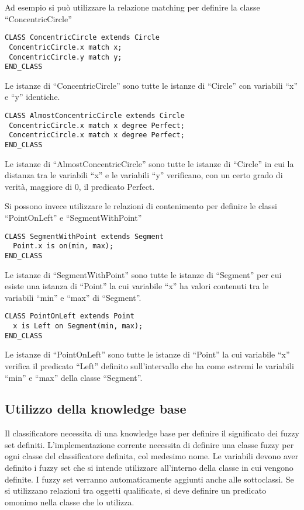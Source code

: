 Ad esempio si può utilizzare la relazione matching per definire la classe ``ConcentricCircle''
\begin{lstlisting}[language=fuzzyClassifier]
CLASS ConcentricCircle extends Circle 
 ConcentricCircle.x match x;
 ConcentricCircle.y match y; 
END_CLASS
\end{lstlisting}

Le istanze di ``ConcentricCircle'' sono tutte le istanze di ``Circle'' con variabili ``x'' e ``y'' identiche. 

\begin{lstlisting}[language=fuzzyClassifier]
CLASS AlmostConcentricCircle extends Circle 
 ConcentricCircle.x match x degree Perfect;
 ConcentricCircle.x match x degree Perfect; 
END_CLASS
\end{lstlisting}

Le istanze di ``AlmostConcentricCircle'' sono tutte le istanze di ``Circle'' in cui la distanza  tra le variabili ``x'' e le variabili ``y'' verificano, con un certo grado di verità, maggiore di 0,  il predicato Perfect.

Si possono invece utilizzare le relazioni di contenimento per definire le classi ``PointOnLeft'' e ``SegmentWithPoint''

\begin{lstlisting}[language=fuzzyClassifier]
CLASS SegmentWithPoint extends Segment
  Point.x is on(min, max);
END_CLASS
\end{lstlisting}

Le istanze di ``SegmentWithPoint'' sono tutte le istanze di ``Segment'' per cui esiste una istanza di ``Point'' la cui variabile ``x'' ha valori contenuti tra le variabili ``min'' e ``max'' di ``Segment''.

\begin{lstlisting}[language=fuzzyClassifier]
CLASS PointOnLeft extends Point 
  x is Left on Segment(min, max);
END_CLASS
\end{lstlisting}

Le istanze di ``PointOnLeft'' sono tutte le istanze di ``Point'' la cui variabile ``x'' verifica il predicato ``Left'' definito sull'intervallo che ha come estremi le variabili ``min'' e ``max'' della classe ``Segment''.


\subsection{Utilizzo della knowledge base}
Il classificatore necessita di una knowledge base per definire il significato dei fuzzy set definiti. 
L'implementazione corrente necessita di definire una classe fuzzy per ogni classe del classificatore definita, col medesimo nome.
Le variabili devono aver definito i fuzzy set che si intende utilizzare all'interno della classe in cui vengono definite. I fuzzy set verranno automaticamente aggiunti anche alle sottoclassi.
Se si utilizzano relazioni tra oggetti qualificate, si deve definire un predicato omonimo nella classe che lo utilizza.

